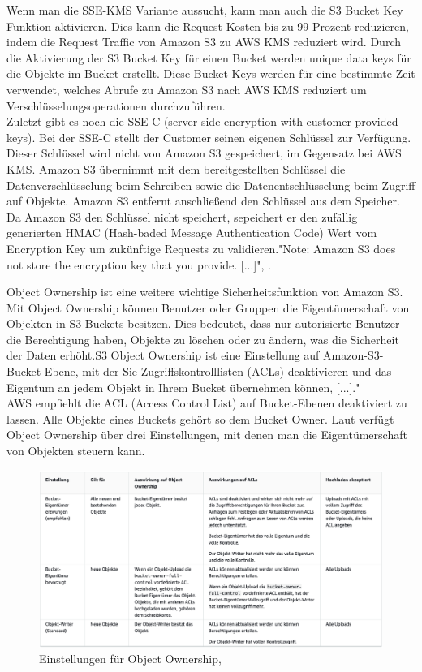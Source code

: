 Wenn man die SSE-KMS Variante aussucht, kann man auch die S3 Bucket Key Funktion aktivieren. Dies kann die Request Kosten bis zu 99 Prozent reduzieren, indem die Request Traffic von Amazon S3 zu AWS KMS reduziert wird. Durch die Aktivierung der S3 Bucket Key für einen Bucket werden unique data keys für die Objekte im Bucket erstellt. Diese Bucket Keys werden für eine bestimmte Zeit verwendet, welches Abrufe zu Amazon S3 nach AWS KMS reduziert um Verschlüsselungsoperationen durchzuführen.\\

Zuletzt gibt es noch die SSE-C (server-side encryption with customer-provided keys). Bei der SSE-C stellt der Customer seinen eigenen Schlüssel zur Verfügung. Dieser Schlüssel wird nicht von Amazon S3 gespeichert, im Gegensatz bei AWS KMS. Amazon S3 übernimmt mit dem bereitgestellten Schlüssel die Datenverschlüsselung beim Schreiben sowie die Datenentschlüsselung beim Zugriff auf Objekte. Amazon S3 entfernt anschließend den Schlüssel aus dem Speicher. Da Amazon S3 den Schlüssel nicht speichert, sepeichert er den zufällig generierten HMAC (Hash-baded Message Authentication Code) Wert vom Encryption Key um zukünftige Requests zu validieren."Note: Amazon S3 does not store the encryption key that you provide. [...]", \cite{aws-sse-c}.\\

\newpage

Object Ownership ist eine weitere wichtige Sicherheitsfunktion von Amazon S3. Mit Object Ownership können Benutzer oder Gruppen die Eigentümerschaft von Objekten in S3-Buckets besitzen. Dies bedeutet, dass nur autorisierte Benutzer die Berechtigung haben, Objekte zu löschen oder zu ändern, was die Sicherheit der Daten erhöht.\glqq S3 Object Ownership ist eine Einstellung auf Amazon-S3-Bucket-Ebene, mit der Sie Zugriffskontrolllisten (ACLs) deaktivieren und das Eigentum an jedem Objekt in Ihrem Bucket übernehmen können, [...]." \cite{aws-iam-s3}\\ 

AWS empfiehlt die ACL (Access Control List) auf Bucket-Ebenen deaktiviert zu lassen. Alle Objekte eines Buckets gehört so dem Bucket Owner. Laut \citeauthor{aws-iam-s3} verfügt Object Ownership über drei Einstellungen, mit denen man die Eigentümerschaft von Objekten steuern kann. 

\begin{figure}[h]
\centering
	\includegraphics[width=16cm,keepaspectratio]{Pictures/objectOwnershipTable.png}
	\caption{Einstellungen für Object Ownership, }
\end{figure}

